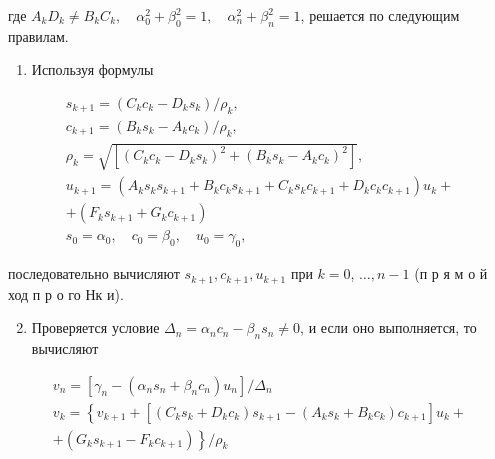 \documentclass[10pt]{article}
\begin{document}
где $A_{k} D_{k} \neq B_{k} C_{k}, \quad \alpha_{0}^{2}+\beta_{0}^{2}=1, \quad \alpha_{n}^{2}+\beta_{n}^{2}=1$, решается по следующим правилам.



\begin{enumerate}

  \item Используя формулы

\end{enumerate}



\[

\begin{gathered}

s_{k+1}=\left(C_{k} c_{k}-D_{k} s_{k}\right) / \rho_{k}, \\

c_{k+1}=\left(B_{k} s_{k}-A_{k} c_{k}\right) / \rho_{k}, \\

\rho_{k}=\sqrt{\left[\left(C_{k} c_{k}-D_{k} s_{k}\right)^{2}+\left(B_{k} s_{k}-A_{k} c_{k}\right)^{2}\right]}, \\

u_{k+1}=\left(A_{k} s_{k} s_{k+1}+B_{k} c_{k} s_{k+1}+C_{k} s_{k} c_{k+1}+D_{k} c_{k} c_{k+1}\right) u_{k}+ \\

+\left(F_{k} s_{k+1}+G_{k} c_{k+1}\right) \\

s_{0}=\alpha_{0}, \quad c_{0}=\beta_{0}, \quad u_{0}=\gamma_{0},

\end{gathered}

\]



последовательно вычисляют $s_{k+1}, c_{k+1}, u_{k+1}$ при $k=0$, $\ldots, n-1$ (п р я м о й ход п р о го Нк и).



\begin{enumerate}

  \setcounter{enumi}{1}

  \item Проверяется условие $\Delta_{n}=\alpha_{n} c_{n}-\beta_{n} s_{n} \neq 0$, и если оно выполняется, то вычисляют

\end{enumerate}



\[

\begin{gathered}

v_{n}=\left[\gamma_{n}-\left(\alpha_{n} s_{n}+\beta_{n} c_{n}\right) u_{n}\right] / \Delta_{n} \\

v_{k}=\left\{v_{k+1}+\left[\left(C_{k} s_{k}+D_{k} c_{k}\right) s_{k+1}-\left(A_{k} s_{k}+B_{k} c_{k}\right) c_{k+1}\right] u_{k}+\right. \\

\left.+\left(G_{k} s_{k+1}-F_{k} c_{k+1}\right)\right\} / \rho_{k}

\end{gathered}

\]
\end{document}

